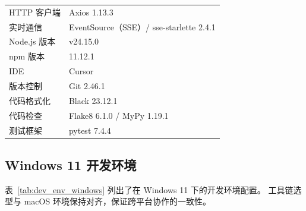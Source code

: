 \documentclass[11pt]{article}
\begin{document}
\begin{table}[htbp]
\begin{tabular}{ll}
    HTTP 客户端 & Axios 1.13.3 \\
    实时通信 & EventSource（SSE）/ sse-starlette 2.4.1 \\
    Node.js 版本 & v24.15.0 \\
    npm 版本 & 11.12.1 \\
    IDE & Cursor \\
    版本控制 & Git 2.46.1 \\
    代码格式化 & Black 23.12.1 \\
    代码检查 & Flake8 6.1.0 / MyPy 1.19.1 \\
    测试框架 & pytest 7.4.4 \\
    \bottomrule
  \end{tabular}
  \label{tab:dev_env_macos}
\end{table}

\subsection{Windows 11 开发环境}

表~\ref{tab:dev_env_windows} 列出了在 Windows 11 下的开发环境配置。
工具链选型与 macOS 环境保持对齐，保证跨平台协作的一致性。
\end{document}
